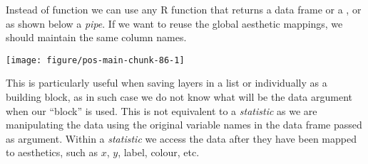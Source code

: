 \documentclass[krantz2]{krantz}\usepackage{knitr}%
\begin{document}
Instead of function  we can use any R function that returns a data frame or a , or as shown below a \emph{pipe}. If we want to reuse the global aesthetic mappings, we should maintain the same column names.

\begin{knitrout}\footnotesize
{}\color{fgcolor}

{\centering \texttt{[image: figure/pos-main-chunk-86-1]} 

}



\end{knitrout}

This is particularly useful when saving layers in a list or individually as a building block, as in such case we do not know what will be the data argument when our ``block'' is used. This is not equivalent to a \emph{statistic} as we are manipulating the data using the original variable names in the data frame passed as argument. Within a \emph{statistic} we access the data after they have been mapped to aesthetics, such as $x$, $y$, label, colour, etc.
\end{document}
